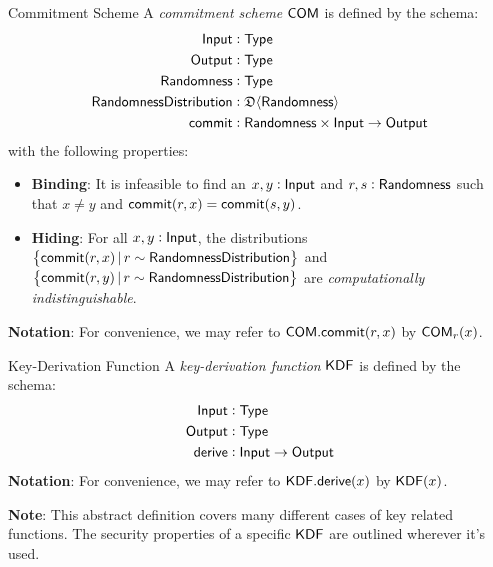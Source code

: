 \begin{definitiontoc}{Commitment Scheme}
    A \emph{commitment scheme} ${\textsf{COM}}$ is defined by the schema:
    \begin{align*}
        {\textsf{Input}}                  &: {\textsf{Type}} \\
        {\textsf{Output}}                 &: {\textsf{Type}} \\
        {\textsf{Randomness}}             &: {\textsf{Type}} \\
        {\textsf{RandomnessDistribution}} &: \mathfrak{D}\langle{{\textsf{Randomness}}}\rangle \\
        {\textsf{commit}}                 &: {\textsf{Randomness}} \times {\textsf{Input}} \to {\textsf{Output}}
    \end{align*}
    with the following properties:
    \begin{itemize}
        \item \textbf{Binding}: It is infeasible to find an $x, y : {\textsf{Input}}$ and $r, s: {\textsf{Randomness}}$ such that $x \ne y$ and ${\textsf{commit}}(r,x) = {\textsf{commit}}(s,y)$.
        \item \textbf{Hiding}: For all $x, y : {\textsf{Input}}$, the distributions $\set{{\textsf{commit}}(r,x) \,|\, r \sim {\textsf{RandomnessDistribution}}}$ and \\ $\set{{\textsf{commit}}(r,y) \,|\, r \sim {\textsf{RandomnessDistribution}}}$ are \emph{computationally indistinguishable}.
    \end{itemize}

    \textbf{Notation}: For convenience, we may refer to ${\textsf{COM}}.{\textsf{commit}}(r,x)$ by ${\textsf{COM}}_r(x)$.
\end{definitiontoc}

\begin{definitiontoc}{Key-Derivation Function}
    A \emph{key-derivation function} ${\textsf{KDF}}$ is defined by the schema:
    \begin{align*}
        {\textsf{Input}}  &: {\textsf{Type}} \\
        {\textsf{Output}} &: {\textsf{Type}} \\
        {\textsf{derive}} &: {\textsf{Input}} \to {\textsf{Output}}
    \end{align*}
    \textbf{Notation}: For convenience, we may refer to ${\textsf{KDF}}.{\textsf{derive}}(x)$ by ${\textsf{KDF}}(x)$.

    \textbf{Note}: This abstract definition covers many different cases of key related functions. The security properties of a specific ${\textsf{KDF}}$ are outlined wherever it's used.
\end{definitiontoc}

